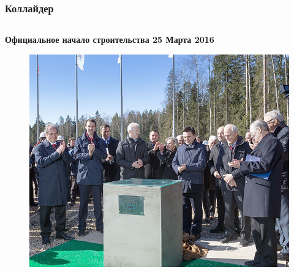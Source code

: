 \documentclass[dvipsnames] {beamer}
\begin{document}
\begin{frame}
  \frametitle{\bf \centering Коллайдер}
  \vskip -0.75cm
  \begin{columns}[t]
    
     \begin{block}{\bf \centering Официальное начало строительства {\color{red} 25 Марта 2016}}
      \begin{figure}[H]
        \includegraphics[width=1.\linewidth]{collider_start.jpg} 
      \end{figure}
     \end{block}

     
  \end{columns}
\end{frame}
\end{document}
